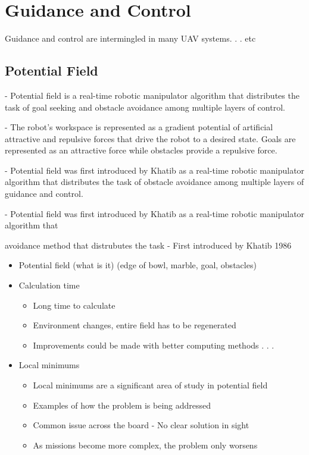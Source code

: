 \documentclass[numbered,pdftex]{ohio-etd}
\begin{document}
\section{Guidance and Control}

Guidance and control are intermingled in many UAV systems. . . etc





\subsection{Potential Field}

- Potential field is a real-time robotic manipulator algorithm that distributes the task of goal seeking and obstacle avoidance among multiple layers of control. 

- The robot's workspace is represented as a gradient potential of artificial attractive and repulsive forces that drive the robot to a desired state. Goals are represented as an attractive force while obstacles provide a repulsive force.


- Potential field was first introduced by Khatib as a real-time robotic manipulator algorithm that distributes the task of obstacle avoidance among multiple layers of guidance and control.

- Potential field was first introduced by Khatib as a real-time robotic manipulator algorithm that 

avoidance method that distrubutes the task 
- First introduced by Khatib 1986


\begin{itemize}
	\item Potential field (what is it) (edge of bowl, marble, goal, obstacles)
	\item Calculation time
	\begin{itemize}
		\item Long time to calculate
		\item Environment changes, entire field has to be regenerated
		\item Improvements could be made with better computing methods . . .
	\end{itemize}
	
	\item Local minimums
	\begin{itemize}
		\item Local minimums are a significant area of study in potential field
		\item Examples of how the problem is being addressed
		\item Common issue across the board - No clear solution in sight
		\item As missions become more complex, the problem only worsens
	\end{itemize}
	
\end{itemize}
\end{document}
